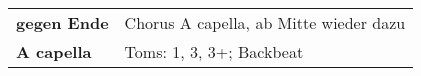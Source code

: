 
\begin{tabular}{p{1.6cm}l}
	\textbf{gegen Ende} & Chorus A capella, ab Mitte wieder dazu \\
	\textbf{A capella}  & Toms: 1, 3, 3+; Backbeat               \\

\end{tabular}
